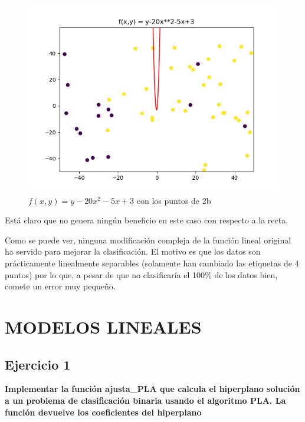 \begin{itemize}
\begin{figure}[H] %
	\centering
	\includegraphics[scale=0.5]{f4.png}  %
	\caption{$f(x,y) =  y -20x^2-5x+3$ con los puntos de 2b} 
	\label{fig:f4}
\end{figure}

Está claro que no genera ningún beneficio en este caso con respecto a la recta.

\end{itemize}

Como se puede ver, ninguna modificación compleja de la función lineal original ha servido para mejorar la clasificación. El motivo es que los datos son prácticamente linealmente separables (solamente han cambiado las etiquetas de 4 puntos) por lo que, a pesar de que no clasificaría el 100\% de los datos bien, comete un error muy pequeño.


\section{MODELOS LINEALES}

\subsection{Ejercicio 1}

\textbf{Implementar la función ajusta\_PLA que calcula el hiperplano solución a un problema de clasificación binaria usando el algoritmo PLA. La función devuelve los coeficientes del hiperplano}

